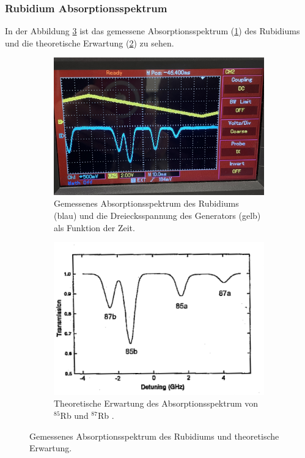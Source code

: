\subsubsection{Rubidium Absorptionsspektrum}
\label{sec:absorption}
In der Abbildung \ref{fig:absorption} ist das gemessene Absorptionsspektrum (\ref{fig:absorption_gemessen}) des Rubidiums und die theoretische Erwartung (\ref{fig:absorption_theoretisch}) zu sehen.
\begin{figure}[H]
    \centering
    \begin{subfigure}{0.45\textwidth}
        \centering
        \includegraphics[width=\textwidth]{pictures/AbsorptionsSpektrum.JPG}
        \caption{Gemessenes Absorptionsspektrum des Rubidiums (blau) und die Dreiecksspannung des Generators (gelb) als Funktion der Zeit.}
        \label{fig:absorption_gemessen}
    \end{subfigure}
    \hfill
    \begin{subfigure}{0.45\textwidth}
        \centering
        \includegraphics[width=\textwidth]{pictures/absorption_theo.png}
        \caption{Theoretische Erwartung des Absorptionsspektrum von $^{85}$Rb und $^{87}$Rb \cite{teachspin}.}
        \label{fig:absorption_theoretisch}
    \end{subfigure}
    \caption{Gemessenes Absorptionsspektrum des Rubidiums und theoretische Erwartung.}
    \label{fig:absorption}
\end{figure}